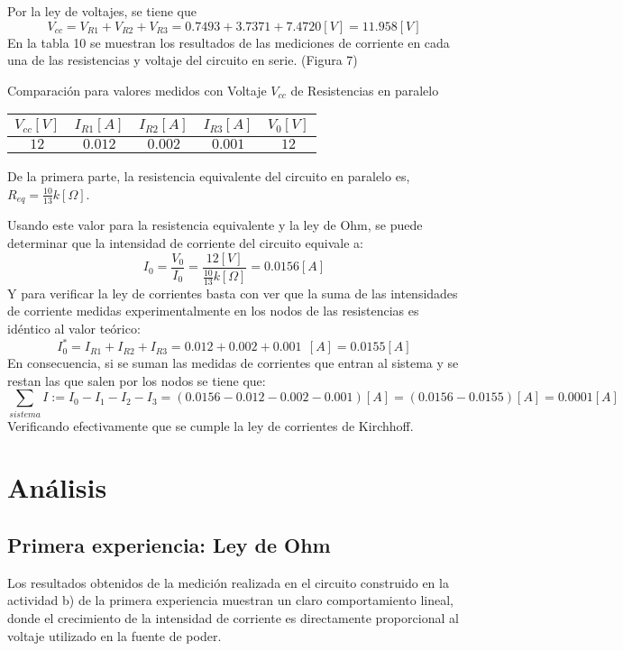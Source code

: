 \documentclass[letterpaper,11pt]{article} %
\begin{document}
Por la ley de voltajes, se tiene que
$$V_{cc}=V_{R1}+V_{R2}+V_{R3}=0.7493+3.7371+7.4720 [V]= 11.958 [V]$$
En la tabla 10 se muestran los resultados de las mediciones de corriente en cada una de las resistencias y voltaje del circuito en serie. (Figura 7) 
\begin{center}
    Comparación para valores medidos con Voltaje $V_{cc}$ de Resistencias en paralelo
    \begin{tabular}{|c|c|c|c|c|}
    \hline
        $V_{cc} [V]$ & $I_{R1} [A]$ & $I_{R2} [A]$ & $I_{R3} [A]$ & $V_{0} [V]$ \\ \hline
        $12$ & $0.012$ & $0.002$ & $0.001$ & $$12$$ \\ \hline
        
    \end{tabular}
\end{center}
De la primera parte, la resistencia equivalente del circuito en paralelo es, $R_{eq}=\frac{10}{13}k[\Omega]$.

Usando este valor para la resistencia equivalente y la ley de Ohm, se puede determinar que la intensidad de corriente del circuito equivale a:
$$I_0=\frac{V_0}{I_0}=\frac{12 [V]}{\frac{10}{13}k[\Omega]}=0.0156 [A] $$
Y para verificar la ley de corrientes basta con ver que la suma de las intensidades de corriente medidas experimentalmente en los nodos de las resistencias es idéntico al valor teórico: 
$$I_0^{*}=I_{R1}+I_{R2}+I_{R3}=0.012+0.002+0.001~~ [A]= 0.0155[A]$$
En consecuencia, si se suman las medidas de corrientes que entran al sistema y se restan las que salen por los nodos se tiene que:
$$\sum_{sistema}{I}:=I_0 - I_1 - I_2 - I_3 = (0.0156 - 0.012 - 0.002 - 0.001) [A] = (0.0156 - 0.0155) [A] = 0.0001 [A]$$
Verificando efectivamente que se cumple la ley de corrientes de Kirchhoff.




\newpage
\section{Análisis}
%
\subsection{Primera experiencia: Ley de Ohm}
Los resultados obtenidos de la medición realizada en el circuito construido en la actividad b) de la primera experiencia muestran un claro comportamiento lineal, donde el crecimiento de la intensidad de corriente es directamente proporcional al voltaje utilizado en la fuente de poder. \\
\end{document}
